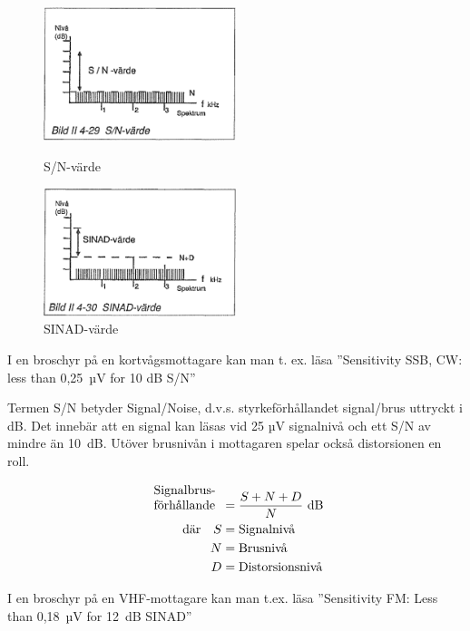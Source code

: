 \begin{figure}
  \includegraphics[width=0.5\textwidth]{images/bild_2_4-29}
  \caption{S/N-värde}
  \label{fig:bildII4-29}

  \includegraphics[width=0.5\textwidth]{images/bild_2_4-30}
  \caption{SINAD-värde}
  \label{fig:bildII4-30}
\end{figure}

I en broschyr på en kortvågsmottagare kan man t. ex. läsa
''Sensitivity SSB, CW: less than 0,25~µV for 10 dB S/N''

Termen S/N betyder Signal/Noise, d.v.s.  styrkeförhållandet
signal/brus uttryckt i dB.  Det innebär att en signal kan läsas vid 25
µV signalnivå och ett S/N av mindre än 10~dB.  Utöver brusnivån i
mottagaren spelar också distorsionen en roll.

\begin{align*}
  \begin{array}[b]{l}
    \text{Signalbrus-} \\
    \text{förhållande}
  \end{array} &= \frac{S + N + D}{N} \text{ dB} \\
  \text{där} \quad S &= \text{Signalnivå} \\
  N &= \text{Brusnivå} \\
  D &= \text{Distorsionsnivå} \\
\end{align*}

I en broschyr på en VHF-mottagare kan man t.ex. läsa
''Sensitivity FM: Less than 0,18~µV for 12~dB SINAD''

